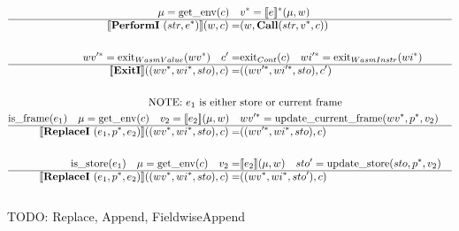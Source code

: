 \begin{align*}
%
\newline \\
  \mu = \text{get\_env}(c) \quad&
  \seq v = \seq{\sem{e}}(\mu, w) \\
  \hline
  \sem{\performi ~ (str, \seq e)}(w, c) =& (w, \call (str, \seq v, c)) \\
%
\newline \\
  \seq{wv'} = \text{exit}_{WasmValue}(\seq{wv}) \quad
  c' =& \text{exit}_{Cont}(c) \quad
  \seq{wi'} = \text{exit}_{WasmInstr}(\seq{wi}) \\
  \hline
  \sem{\exiti}((\seq{wv}, \seq{wi}, sto), c)
  =&
  ((\seq{wv'}, \seq{wi'}, sto), c') \\
%
\newline \\
\text{NOTE: $e_1$ is either }&\text{store or current frame} \\
  \text{is\_frame}(e_1) \quad
  \mu = \text{get\_env}(c) \quad
  v_2 = \sem{e_2}(\mu, w) \quad&
  \seq{wv'} = \text{update\_current\_frame}(\seq{wv}, \seq p, v_2) \\
  \hline
  \sem{\replacei ~ (e_1, \seq p, e_2)}((\seq{wv}, \seq{wi}, sto), c)
  =& ((\seq{wv'}, \seq{wi}, sto), c) \\
%
\newline \\
  \text{is\_store}(e_1) \quad
  \mu = \text{get\_env}(c) \quad
  v_2 =& \sem{e_2}(\mu, w) \quad
  sto' = \text{update\_store}(sto, \seq p, v_2) \\
  \hline
  \sem{\replacei ~ (e_1, \seq p, e_2)}((\seq{wv}, \seq{wi}, sto), c)
  =& ((\seq{wv}, \seq{wi}, sto'), c) \\
\newline \\
\end{align*}
TODO: Replace, Append, FieldwiseAppend

